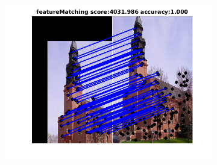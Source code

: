 \documentclass[
	fontsize=12pt,
	paper=a4,
	twoside=false,
	numbers=noenddot,
	plainheadsepline,
	toc=listof,
	toc=bibliography
]{scrartcl}
\begin{document}
\begin{figure}[h]
\begin{subfigure}[b]{0.3\textwidth}
		\includegraphics[scale=0.4]{"fig_ver2608/RealImages/Img_trafo/no_descr/using_cdf_afftrafo/fi_4_featM"} 
	\end{subfigure} 	


\end{figure}
\end{document}
